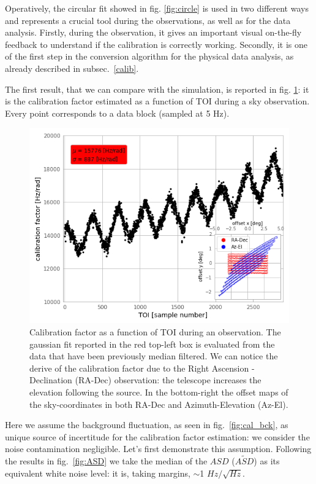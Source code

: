 \documentclass[twocolumn,traditabstract]{aa}\\
\begin{document}
\noindent Operatively, the circular fit showed in fig. \ref{fig:circle} is used in two different ways and represents a crucial tool during the observations, as well as for the data analysis. Firstly, during the observation, it gives an important visual on-the-fly feedback to understand if the calibration is correctly working. Secondly, it is one of the first step in the conversion algorithm for the physical data analysis, as already described in subsec.~\ref{calib}.

The first result, that we can compare with the simulation, is reported in fig. \ref{fig:calfact}: it is the calibration factor estimated as a function of TOI during a sky observation. Every point corresponds to a data block (sampled at 5 Hz).

\begin{figure}[htf]
	\centering
	\includegraphics[width=.5\textwidth]{4.results/calfact.png}
	\caption{Calibration factor as a function of TOI during an observation. The gaussian fit reported in the red top-left box is evaluated from the data that have been previously median filtered. We can notice the derive of the calibration factor due to the Right Ascension - Declination (RA-Dec) observation: the telescope increases the elevation following the source. In the bottom-right the offset maps of the sky-coordinates in both RA-Dec and Azimuth-Elevation (Az-El).}
	\label{fig:calfact}
\end{figure}


Here we assume the background fluctuation, as seen in fig.~\ref{fig:cal_bck}, as unique source of incertitude for the calibration factor estimation: we consider the noise contamination negligible. Let's first demonstrate this assumption. Following the results in fig.~\ref{fig:ASD} we take the median of the $ASD$ ($\tilde{ASD}$) as its equivalent white noise level: it is, taking margins, $\sim$1 $Hz/\sqrt{Hz}$.
\end{document}

